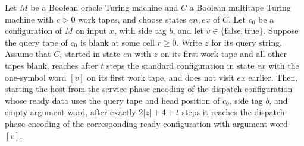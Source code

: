 \begin{theorem}
\label{Turing.oracleHost_service}
\leanok
{}
Let $M$ be a Boolean oracle Turing machine and $C$ a Boolean multitape Turing machine
with $c>0$ work tapes, and choose states $en,ex$ of $C$. Let $c_0$ be a configuration of
$M$ on input $x$, with side tag $b$, and let $v\in\{\mathrm{false},\mathrm{true}\}$.
Suppose the query tape of $c_0$ is blank at some cell $r\ge0$. Write $z$ for its query
string. Assume that $C$, started in state $en$ with $z$ on its first work tape and all
other tapes blank, reaches after $t$ steps the standard configuration in state $ex$ with
the one-symbol word $[v]$ on its first work tape, and does not visit $ex$ earlier. Then,
starting the host from the service-phase encoding of the dispatch configuration whose
ready data uses the query tape and head position of $c_0$, side tag $b$, and empty
argument word, after exactly $2|z|+4+t$ steps it reaches the dispatch-phase encoding of
the corresponding ready configuration with argument word $[v]$.
\end{theorem}


